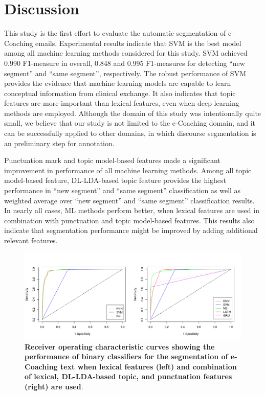 \documentclass{amia}
\begin{document}
\section*{Discussion}
This study is the first effort to evaluate the automatic segmentation of e-Coaching emails. Experimental results indicate that SVM is the best model among all machine learning methods considered for this study. SVM achieved 0.990 F1-measure in overall, 0.848 and 0.995 F1-measures for detecting ``new segment'' and ``same segment'', respectively. The robust performance of SVM provides the evidence that machine learning models are capable to learn conceptual information from clinical exchange. It also indicates that topic features are more important than lexical features, even when deep learning methods are employed. Although the domain of this study was intentionally quite small, we believe that our study is not limited to the e-Coaching domain, and it can be successfully applied to other domains, in which discourse segmentation is an preliminary step for annotation.

Punctuation mark and topic model-based features made a significant improvement in performance of all machine learning methods. Among all topic model-based feature, DL-LDA-based topic feature provides the highest performance in ``new segment'' and ``same segment'' classification as well as weighted average over ``new segment'' and ``same segment'' classification results. In nearly all cases, ML methods perform better, when lexical features are used in combination with punctuation and topic model-based features. This results also indicate that segmentation performance might be improved by adding additional relevant features.         

\begin{figure}[!htb]
    \centering
    \includegraphics[width=1.0\textwidth]{figures/roc-curves.png}
    \caption{\textbf{Receiver operating characteristic curves showing the performance of binary classifiers for the segmentation of e-Coaching text when lexical features (left) and combination of lexical, DL-LDA-based topic, and punctuation features (right) are used}.}
    \label{fig:roc-curves}
\end{figure}
\end{document}
